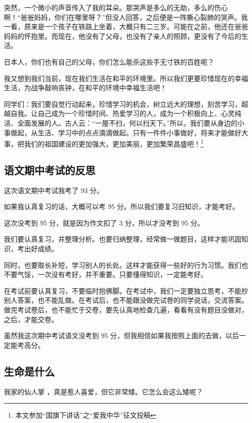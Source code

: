 \documentclass[UTF8,a4paper,titlepage,twoside,10.5pt]{article}
\begin{document}
突然，一个微小的声音传入了我的耳朵。那哭声是多么的无助，多么的伤心啊！“爸爸妈妈，你们在哪里呀？”但没人回答，之后便是一阵撕心裂肺的哭声。我一看，原来是一个孩子在铁路上坐着，大概只有二三岁。可能在之前，他还在爸爸妈妈的怀抱里。而现在，他没有了父母，也没有了亲人的照顾，更没有了今后的生活。

日本人，你们也有自己的父母，你们怎么能杀这些手无寸铁的百姓呢？

我又想到我们当前，现在我们生活在和平的环境里。所以我们更要珍惜现在的幸福生活，为战争敲响丧钟，在和平的环境中幸福生活吧！

同学们：我们要自觉行动起来，珍惜学习的机会，树立远大的理想，刻苦学习，超越自我。让自己成为一个珍惜时间、热爱学习的人，成为一个积极向上、心灵纯洁、全面发展的人。古人云：“一屋不扫，何以扫天下。”所以，我们要从身边的小事做起，从生活、学习中的点点滴滴做起。只有一件件小事做好，将来才能做好大事，把我们的祖国建设的更加强大，更加美丽，更加繁荣昌盛吧！\footnote{本文参加“国旗下讲话”之“爱我中华”征文投稿}

\subsection{语文期中考试的反思}
\label{sec:org97d089a}

这次语文期中考试我考了 93 分。

如果我认真复习的话，大概可以考 95 分。所以我们要复习旧知识，才能考好。

这次没考到 95 分，就是因为作文扣了 3 分，所以才没考到 95 分。

我们要认真复习，并整理分析。也要归纳整理，经常做一做题目，这样才能巩固知识，考出好成绩。

同时，也要取长补短，学习别人的长处。这样才能获得一些好的行为习惯。我们也不要气馁，一次没有考好，并不重要。只要懂得知识，一定能考好。

在考试前要认真复习，不要临时抱佛脚。在考试中，我们一定要独立思考，不能抄别人答案，也不能乱做。在考试后，也不能跟没做完试卷的同学说话，交流答案。做完考试卷后，也不能忙于交卷，要先认真地检查几遍，看看有没有题目没做对，之后，才能交卷。

虽然我这次期中考试语文没考到 95 分，但我相信如果我按照上面的去做，以后一定能考高分。

\subsection{生命是什么}
\label{sec:org880471a}

我家的仙人掌 ，真是惹人喜爱，但它非常矮。它怎么会这么矮呢？
\end{document}
